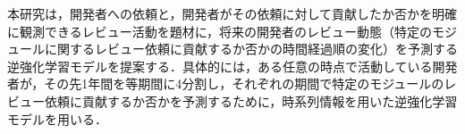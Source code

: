 \documentclass[submit,noauthor,ses,dvipdfmx]{ipsj}
\newcommand{\todo}[1]{\colorbox{yellow}{{\bf TODO}:}{\color{red} {\textbf{[#1]}}}}
\begin{document}
本研究は，開発者への依頼と，開発者がその依頼に対して貢献したか否かを明確に観測できるレビュー活動を題材に，将来の開発者のレビュー動態（特定のモジュールに関するレビュー依頼に貢献するか否かの時間経過順の変化）を予測する逆強化学習モデルを提案する．具体的には，ある任意の時点で活動している開発者が，その先1年間を等期間に4分割し，それぞれの期間で特定のモジュールのレビュー依頼に貢献するか否かを予測するために，時系列情報を用いた逆強化学習モデルを用いる．






\end{document}
